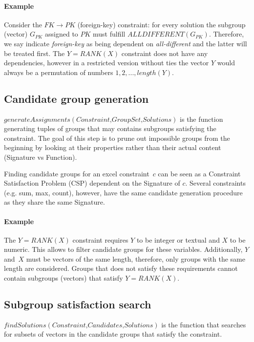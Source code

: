 \documentclass{ecai}
\newcommand{\format}[1]{\textit{#1}\xspace}
\newcommand{\generategroups}{\format{generateAssignments}}
\newcommand{\findassignment}{\format{findSolutions}}
\newcommand{\CSignature}{Signature\xspace}
\newcommand{\CFunction}{Function\xspace}
\newcommand{\ecrank}[2]{\ensuremath{#1 = \mathit{RANK}(#2)}}
\newcommand{\ecfkey}[2]{\ensuremath{#1 \rightarrow #2}}
\newcommand{\ecalldiff}[1]{\ensuremath{\mathit{ALLDIFFERENT}(#1)}}
\begin{document}
\paragraph{Example}
Consider the \ecfkey{FK}{PK} (foreign-key) constraint: for every solution the subgroup (vector) $G_{PK}$ assigned to $PK$ must fulfill \ecalldiff{G_{PK}}.
Therefore, we say indicate \textit{foreign-key} as being dependent on \textit{all-different} and the latter will be treated first.
The \ecrank{Y}{X} constraint does not have any dependencies, however in a restricted version without ties the vector $Y$ would always be a permutation of numbers $1, 2, ..., length(Y)$.

\subsection{Candidate group generation}
$\generategroups(\textit{Constraint,GroupSet,Solutions})$ is the function generating tuples of groups that may contains subgroups satisfying the constraint.
The goal of this step is to prune out impossible groups from the beginning by looking at their properties rather than their actual content (\CSignature vs \CFunction).

Finding candidate groups for an excel constraint~$c$ can be seen as a Constraint Satisfaction Problem (CSP) dependent on the \CSignature of $c$.
Several constraints (e.g. sum, max, count), however, have the same candidate generation procedure as they share the same \CSignature.

\paragraph{Example}
The \ecrank{Y}{X} constraint requires $Y$ to be integer or textual and $X$ to be numeric.
This allows to filter candidate groups for these variables.
Additionally, $Y$ and~$X$ must be vectors of the same length, therefore, only groups with the same length are considered.
Groups that does not satisfy these requirements cannot contain subgroups (vectors) that satisfy \ecrank{Y}{X}.

\subsection{Subgroup satisfaction search}
$\findassignment(\textit{Constraint,Candidates,Solutions})$ is the function that searches for subsets of vectors in the candidate groups that satisfy the constraint.
\end{document}
